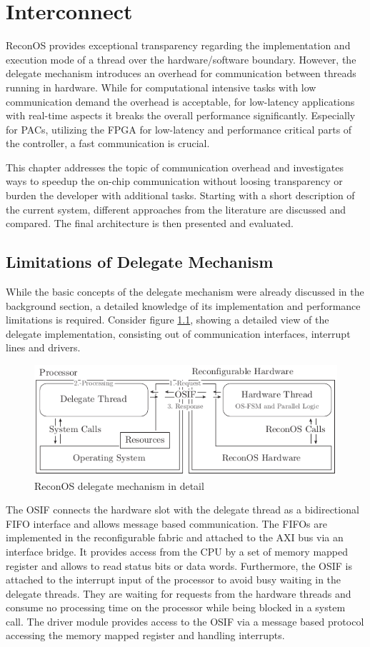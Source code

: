 \chapter{Interconnect}
\label{sec:interconnect}
ReconOS provides exceptional transparency regarding the implementation and
execution mode of a thread over the hardware/software boundary. However, the
delegate mechanism introduces an overhead for communication between threads
running in hardware. While for computational intensive tasks with low
communication demand the overhead is acceptable, for low-latency applications
with real-time aspects it breaks the overall performance significantly.
Especially for \acp{PAC}, utilizing the \ac{FPGA} for low-latency and
performance critical parts of the controller, a fast communication is crucial.

This chapter addresses the topic of communication overhead and investigates
ways to speedup the on-chip communication without loosing transparency or
burden the developer with additional tasks. Starting with a short description
of the current system, different approaches from the literature are discussed
and compared. The final architecture is then presented and evaluated.

\section{Limitations of Delegate Mechanism}
While the basic concepts of the delegate mechanism were already discussed in
the background section, a detailed knowledge of its implementation and
performance limitations is required. Consider figure \ref{fig:delegate},
showing a detailed view of the delegate implementation, consisting out of
communication interfaces, interrupt lines and drivers.
\begin{figure}[tb]
	\centering
	\includegraphics[width=12cm]{../figures/delegate}
	\caption{ReconOS delegate mechanism in detail}
	\label{fig:delegate}
\end{figure}
 The \ac{OSIF} connects the hardware slot with the delegate thread as a
bidirectional \ac{FIFO} interface and allows message based communication. The
\acp{FIFO} are implemented in the reconfigurable fabric and attached to the
\ac{AXI} bus via an interface bridge. It provides access from the \ac{CPU} by
a set of memory mapped register and allows to read status bits or data words.
Furthermore, the \ac{OSIF} is attached to the interrupt input of the processor
to avoid busy waiting in the delegate threads. They are waiting for requests
from the hardware threads and consume no processing time on the processor
while being blocked in a system call. The driver module provides access to the
\ac{OSIF} via a message based protocol accessing the memory mapped register
and handling interrupts.


